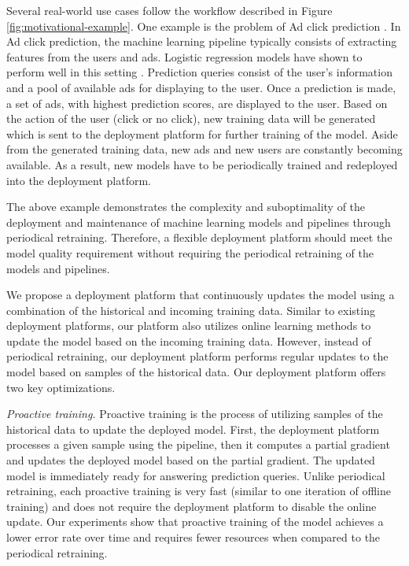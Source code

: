 Several real-world use cases follow the workflow described in Figure \ref{fig:motivational-example}.
One example is the problem of Ad click prediction \cite{macmahan2013}.
In Ad click prediction, the machine learning pipeline typically consists of extracting features from the users and ads. 
Logistic regression models have shown to perform well in this setting \cite{macmahan2013}.
Prediction queries consist of the user's information and a pool of available ads for displaying to the user.
Once a prediction is made, a set of ads, with highest prediction scores, are displayed to the user.
Based on the action of the user (click or no click), new training data will be generated which is sent to the deployment platform for further training of the model.
Aside from the generated training data, new ads and new users are constantly becoming available.
As a result, new models have to be periodically trained and redeployed into the deployment platform.

The above example demonstrates the complexity and suboptimality of the deployment and maintenance of machine learning models and pipelines through periodical retraining.
Therefore, a flexible deployment platform should meet the model quality requirement without requiring the periodical retraining of the models and pipelines.

We propose a deployment platform that continuously updates the model using a combination of the historical and incoming training data.
Similar to existing deployment platforms, our platform also utilizes online learning methods to update the model based on the incoming training data.
However, instead of periodical retraining, our deployment platform performs regular updates to the model based on samples of the historical data.
Our deployment platform offers two key optimizations.

\textit{Proactive training.}
Proactive training is the process of utilizing samples of the historical data to update the deployed model.
First, the deployment platform processes a given sample using the pipeline, then it computes a partial gradient and updates the deployed model based on the partial gradient.
The updated model is immediately ready for answering prediction queries.
Unlike periodical retraining, each proactive training is very fast (similar to one iteration of offline training) and does not require the deployment platform to disable the online update.
Our experiments show that proactive training of the model achieves a lower error rate over time and requires fewer resources when compared to the periodical retraining.

